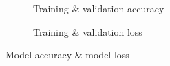 \begin{figure}[htbp]
    \centering
    \begin{subfigure}[t]{0.45\textwidth}
        \caption{Training \& validation accuracy}
        \label{fig:4.4a}
    \end{subfigure}
    \begin{subfigure}[t]{0.45\textwidth}
        \caption{Training \& validation loss}
        \label{fig:4.4b}
    \end{subfigure}
    \caption[]{Model accuracy \& model loss}
    \label{fig:4.4}
  \end{figure}


